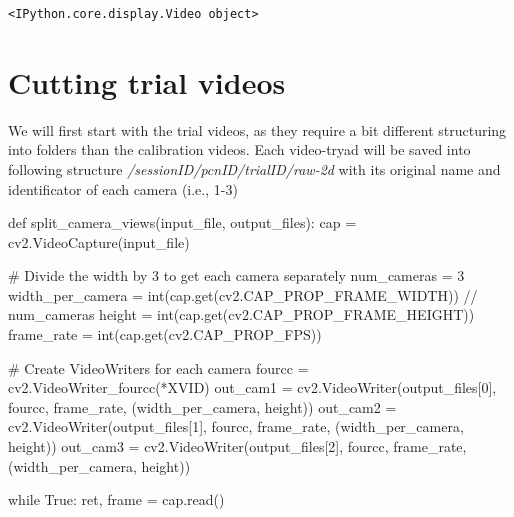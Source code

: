\documentclass[
  letterpaper,
  DIV=11,
  numbers=noendperiod]{scrreprt}
\newenvironment{Shaded}{\begin{snugshade}}{\end{snugshade}}
\newcommand{\BuiltInTok}[1]{\textcolor[rgb]{0.00,0.23,0.31}{#1}}
\newcommand{\CommentTok}[1]{\textcolor[rgb]{0.37,0.37,0.37}{#1}}
\newcommand{\ControlFlowTok}[1]{\textcolor[rgb]{0.00,0.23,0.31}{#1}}
\newcommand{\DecValTok}[1]{\textcolor[rgb]{0.68,0.00,0.00}{#1}}
\newcommand{\KeywordTok}[1]{\textcolor[rgb]{0.00,0.23,0.31}{#1}}
\newcommand{\NormalTok}[1]{\textcolor[rgb]{0.00,0.23,0.31}{#1}}
\newcommand{\OperatorTok}[1]{\textcolor[rgb]{0.37,0.37,0.37}{#1}}
\newcommand{\StringTok}[1]{\textcolor[rgb]{0.13,0.47,0.30}{#1}}
\newcommand{\VariableTok}[1]{\textcolor[rgb]{0.07,0.07,0.07}{#1}}
\begin{document}
\begin{verbatim}
<IPython.core.display.Video object>
\end{verbatim}


\chapter{Cutting trial videos}\label{cutting-trial-videos}

We will first start with the trial videos, as they require a bit
different structuring into folders than the calibration videos. Each
video-tryad will be saved into following structure
\emph{/sessionID/pcnID/trialID/raw-2d} with its original name and
identificator of each camera (i.e., 1-3)

\begin{Shaded}
\begin{Highlighting}[]
\KeywordTok{def}\NormalTok{ split\_camera\_views(input\_file, output\_files):}
\NormalTok{    cap }\OperatorTok{=}\NormalTok{ cv2.VideoCapture(input\_file)}

    \CommentTok{\# Divide the width by 3 to get each camera separately}
\NormalTok{    num\_cameras }\OperatorTok{=} \DecValTok{3}
\NormalTok{    width\_per\_camera }\OperatorTok{=} \BuiltInTok{int}\NormalTok{(cap.get(cv2.CAP\_PROP\_FRAME\_WIDTH)) }\OperatorTok{//}\NormalTok{ num\_cameras}
\NormalTok{    height }\OperatorTok{=} \BuiltInTok{int}\NormalTok{(cap.get(cv2.CAP\_PROP\_FRAME\_HEIGHT))}
\NormalTok{    frame\_rate }\OperatorTok{=} \BuiltInTok{int}\NormalTok{(cap.get(cv2.CAP\_PROP\_FPS))}

    \CommentTok{\# Create VideoWriters for each camera}
\NormalTok{    fourcc }\OperatorTok{=}\NormalTok{ cv2.VideoWriter\_fourcc(}\OperatorTok{*}\StringTok{\textquotesingle{}XVID\textquotesingle{}}\NormalTok{)}
\NormalTok{    out\_cam1 }\OperatorTok{=}\NormalTok{ cv2.VideoWriter(output\_files[}\DecValTok{0}\NormalTok{], fourcc, frame\_rate, (width\_per\_camera, height))}
\NormalTok{    out\_cam2 }\OperatorTok{=}\NormalTok{ cv2.VideoWriter(output\_files[}\DecValTok{1}\NormalTok{], fourcc, frame\_rate, (width\_per\_camera, height))}
\NormalTok{    out\_cam3 }\OperatorTok{=}\NormalTok{ cv2.VideoWriter(output\_files[}\DecValTok{2}\NormalTok{], fourcc, frame\_rate, (width\_per\_camera, height))}

    \ControlFlowTok{while} \VariableTok{True}\NormalTok{:}
\NormalTok{        ret, frame }\OperatorTok{=}\NormalTok{ cap.read()}


\end{Highlighting}
\end{Shaded}
\end{document}
